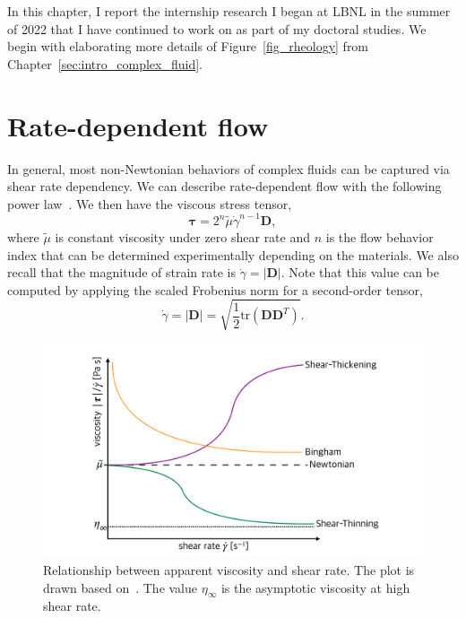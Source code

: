 \par
In this chapter, I report the internship research I began at LBNL in the summer of 2022 that I have continued to work on as part of my doctoral studies.
We begin with elaborating more details of Figure~\ref{fig_rheology} from Chapter~\ref{sec:intro_complex_fluid}. 

\section{Rate-dependent flow}
In general, most non-Newtonian behaviors of complex fluids can be captured via shear rate dependency. 
We can describe rate-dependent flow with the following power law~\cite{herschel_konsistenzmessungen_1926}. We then have the viscous stress tensor, 
\begin{equation}
  {\bm \tau}
  =2^n \tilde{\mu} \dot{\gamma} ^{n-1} {\bm D},
  \label{eq_HS_tau}
  \end{equation}
where $\tilde{\mu}$ is constant viscosity under zero shear rate and $n$ is the flow behavior index that can be determined experimentally depending on the materials.
We also recall that the magnitude of strain rate is $\dot{\gamma} = |\bm{D}|$.
Note that this value can be computed by applying the scaled Frobenius norm for a second-order tensor, 
\[
  \dot{\gamma}  = |\bm{D}| = \sqrt{\frac{1}{2}
    \text{tr}\left(\bm{D} \bm{D}^{T} \right)}.
\]
\begin{figure}[ht]
  \begin{center}
    \includegraphics[scale=0.19]{figures/fig_appr_viscosity.pdf}
    \end{center}
  \caption{Relationship between apparent viscosity and shear rate. The plot is drawn based on~\cite{irgens_rheology_2014}. The value $\eta_{\infty}$ is the asymptotic viscosity at high shear rate.}
  \label{fig_appr_viscosity}
\end{figure}
